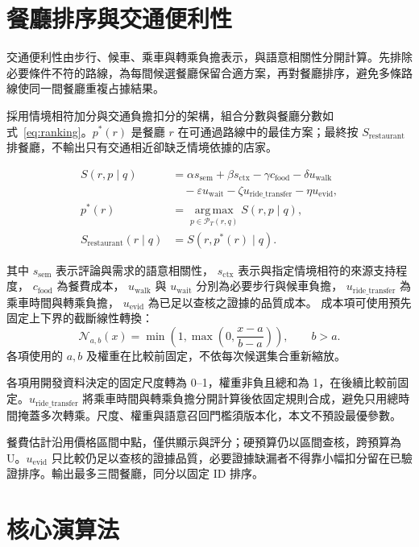 \section{餐廳排序與交通便利性}
\label{sec:ranking}

交通便利性由步行、候車、乘車與轉乘負擔表示，與語意相關性分開計算。先排除必要條件不符的路線，為每間候選餐廳保留合適方案，再對餐廳排序，避免多條路線使同一間餐廳重複占據結果。

採用情境相符加分與交通負擔扣分的架構，組合分數與餐廳分數如式~\ref{eq:ranking}。\(p^*(r)\) 是餐廳 \(r\) 在可通過路線中的最佳方案；最終按 \(S_{\mathrm{restaurant}}\) 排餐廳，不輸出只有交通相近卻缺乏情境依據的店家。

\begin{equation}\label{eq:ranking}
\begin{aligned}
S(r,p\mid q) &= \alpha s_{\mathrm{sem}}+\beta s_{\mathrm{ctx}}
-\gamma c_{\mathrm{food}}-\delta u_{\mathrm{walk}}\\
&\quad-\varepsilon u_{\mathrm{wait}}
-\zeta u_{\mathrm{ride\_transfer}}-\eta u_{\mathrm{evid}},\\
p^*(r) &= \operatorname*{arg\,max}_{p\in\mathcal{P}_{T}(r,q)}S(r,p\mid q),\\
S_{\mathrm{restaurant}}(r\mid q)&=S(r,p^*(r)\mid q).
\end{aligned}
\end{equation}


其中 \(s_{\mathrm{sem}}\) 表示評論與需求的語意相關性，
\(s_{\mathrm{ctx}}\) 表示與指定情境相符的來源支持程度，
\(c_{\mathrm{food}}\) 為餐費成本，
\(u_{\mathrm{walk}}\) 與 \(u_{\mathrm{wait}}\) 分別為必要步行與候車負擔，
\(u_{\mathrm{ride\_transfer}}\) 為乘車時間與轉乘負擔，
\(u_{\mathrm{evid}}\) 為已足以查核之證據的品質成本。
成本項可使用預先固定上下界的截斷線性轉換：
\[
\mathcal{N}_{a,b}(x)
=\min\!\left(1,\max\!\left(0,\frac{x-a}{b-a}\right)\right),\qquad b>a.
\]
各項使用的 \(a,b\) 及權重在比較前固定，不依每次候選集合重新縮放。

各項用開發資料決定的固定尺度轉為 0–1，權重非負且總和為 1，在後續比較前固定。\(u_{\mathrm{ride\_transfer}}\) 將乘車時間與轉乘負擔分開計算後依固定規則合成，避免只用總時間掩蓋多次轉乘。尺度、權重與語意召回門檻須版本化，本文不預設最優參數。

餐費估計沿用價格區間中點，僅供顯示與評分；硬預算仍以區間查核，跨預算為 U。\(u_{\mathrm{evid}}\) 只比較仍足以查核的證據品質，必要證據缺漏者不得靠小幅扣分留在已驗證排序。輸出最多三間餐廳，同分以固定 ID 排序。

\section{核心演算法}
\label{sec:algorithm}


